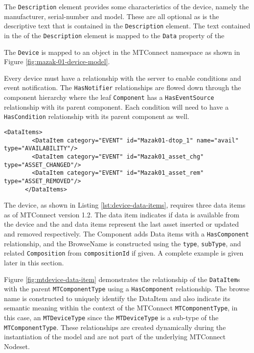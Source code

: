 The \texttt{Description} element provides some characteristics of the device, namely the manufacturer, serial-number and model. These are all optional as is the descriptive text that is contained in the \texttt{Description} element. The text contained in the  of the \texttt{Description} element is mapped to the \texttt{Data} property of the 

The \texttt{Device} is mapped to an  object in the MTConnect namespace as shown in Figure \ref{fig:mazak-01-device-model}.



Every device must have a  relationship with the server to enable conditions and event notification. The \texttt{HasNotifier} relationships are flowed down through the component hierarchy where the leaf \texttt{Component} has a \texttt{HasEventSource} relationship with its parent component. Each condition will need to have a \texttt{HasCondition} relationship with its parent component as well. 

\begin{lstlisting}[firstnumber=last,%
    caption={Device Data Items},label={lst:device-data-items}]
      <DataItems>
        <DataItem category="EVENT" id="Mazak01-dtop_1" name="avail" type="AVAILABILITY"/>
        <DataItem category="EVENT" id="Mazak01_asset_chg" type="ASSET_CHANGED"/>
        <DataItem category="EVENT" id="Mazak01_asset_rem" type="ASSET_REMOVED"/>
      </DataItems>
\end{lstlisting}

The device, as shown in Listing \ref{lst:device-data-items}, requires three data items as of MTConnect version 1.2. The  data item indicates if data is available from the device and the  and  data items represent the last asset inserted or updated and removed respectively. The Component adds Data items with a \texttt{Has\-Component} relationship, and the BrowseName is constructed using the \texttt{type}, \texttt{sub\-Type}, and related \texttt{Composition} from \texttt{compositionId} if given. A complete example is given later in this section.



Figure \ref{fig:mtdevice-data-item} demonstrates the relationship of the \texttt{Data\-Item}s with the parent \texttt{MTComponent\-Type} using a \texttt{Has\-Component} relationship. The browse name is constructed to uniquely identify the DataItem and also indicate its semantic meaning within the context of the MTConnect \texttt{MTComponent\-Type}, in this case, an \texttt{MTDevice\-Type} since the \texttt{MTDevice\-Type} is a sub-type of the \texttt{MTComponent\-Type}. These relationships are created dynamically during the instantiation of the model and are not part of the underlying MTConnect Nodeset.

